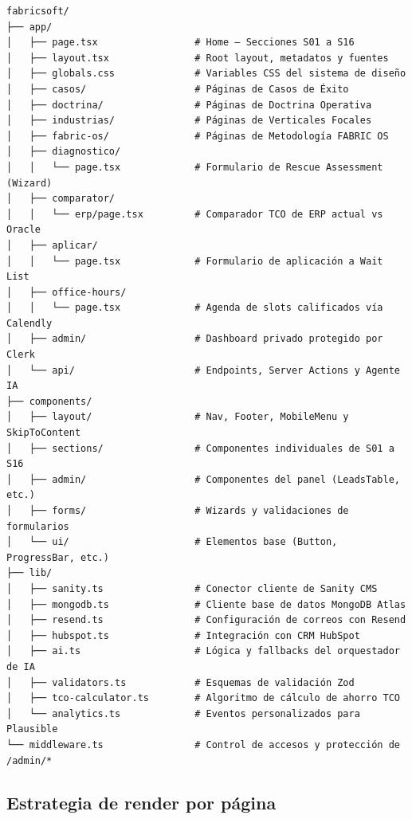 \documentclass[11pt,letterpaper]{article}
\begin{document}
\begin{Verbatim}[fontsize=\small, breaklines=true]
fabricsoft/
├── app/
│   ├── page.tsx                 # Home — Secciones S01 a S16
│   ├── layout.tsx               # Root layout, metadatos y fuentes
│   ├── globals.css              # Variables CSS del sistema de diseño
│   ├── casos/                   # Páginas de Casos de Éxito
│   ├── doctrina/                # Páginas de Doctrina Operativa
│   ├── industrias/              # Páginas de Verticales Focales
│   ├── fabric-os/               # Páginas de Metodología FABRIC OS
│   ├── diagnostico/
│   │   └── page.tsx             # Formulario de Rescue Assessment (Wizard)
│   ├── comparator/
│   │   └── erp/page.tsx         # Comparador TCO de ERP actual vs Oracle
│   ├── aplicar/
│   │   └── page.tsx             # Formulario de aplicación a Wait List
│   ├── office-hours/
│   │   └── page.tsx             # Agenda de slots calificados vía Calendly
│   ├── admin/                   # Dashboard privado protegido por Clerk
│   └── api/                     # Endpoints, Server Actions y Agente IA
├── components/
│   ├── layout/                  # Nav, Footer, MobileMenu y SkipToContent
│   ├── sections/                # Componentes individuales de S01 a S16
│   ├── admin/                   # Componentes del panel (LeadsTable, etc.)
│   ├── forms/                   # Wizards y validaciones de formularios
│   └── ui/                      # Elementos base (Button, ProgressBar, etc.)
├── lib/
│   ├── sanity.ts                # Conector cliente de Sanity CMS
│   ├── mongodb.ts               # Cliente base de datos MongoDB Atlas
│   ├── resend.ts                # Configuración de correos con Resend
│   ├── hubspot.ts               # Integración con CRM HubSpot
│   ├── ai.ts                    # Lógica y fallbacks del orquestador de IA
│   ├── validators.ts            # Esquemas de validación Zod
│   ├── tco-calculator.ts        # Algoritmo de cálculo de ahorro TCO
│   └── analytics.ts             # Eventos personalizados para Plausible
└── middleware.ts                # Control de accesos y protección de /admin/*
\end{Verbatim}

\subsection{Estrategia de render por página}
\end{document}
